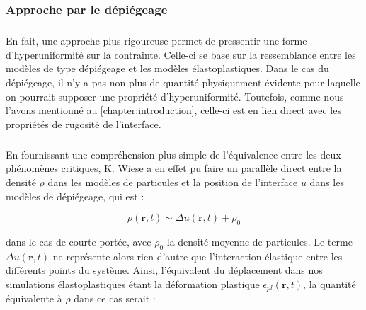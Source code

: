 %
%
%

\subsubsection{Approche par le dépiégeage}

\subparagraph{}En fait, une approche plus rigoureuse permet de pressentir une forme d'hyperuniformité sur la contrainte. Celle-ci se base sur la ressemblance entre les modèles de type dépiégeage et les modèles élastoplastiques. Dans le cas du dépiégeage, il n'y a pas non plus de quantité physiquement évidente pour laquelle on pourrait supposer une propriété d'hyperuniformité. Toutefois, comme nous l'avons mentionné au \autoref{chapter:introduction}, celle-ci est en lien direct avec les propriétés de rugosité de l'interface.

\subparagraph{}En fournissant une compréhension plus simple de l'équivalence entre les deux phénomènes critiques, K. Wiese \cite{wiese_hyperuniformity_2024} a en effet pu faire un parallèle direct entre la densité $\rho$ dans les modèles de particules et la position de l'interface $u$ dans les modèles de dépiégeage, qui est :

\begin{equation}
	\rho(\mathbf{r},t) \sim \Delta u(\mathbf{r},t) + \rho_0
\end{equation}

\noindent dans le cas de courte portée, avec $\rho_0$ la densité moyenne de particules. Le terme $\Delta u(\mathbf{r},t)$ ne représente alors rien d'autre que l'interaction élastique entre les différents points du système. Ainsi, l'équivalent du déplacement dans nos simulations élastoplastiques étant la déformation plastique $
\epsilon_{pl}(\mathbf{r},t)$, la quantité équivalente à $\rho$ dans ce cas serait :

